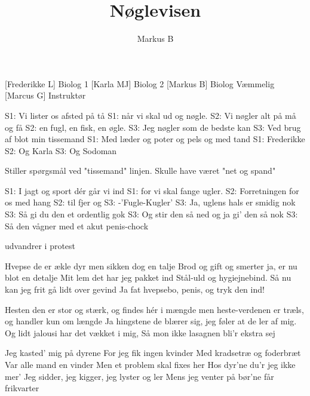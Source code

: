 \documentclass[a4paper,11pt]{article}
\title{Nøglevisen}
\author{Markus B}
\begin{document}
\maketitle

\begin{roles}
[Frederikke L] Biolog 1
[Karla MJ] Biolog 2
[Markus B] Biolog Væmmelig
[Marcus G] Instruktør
\end{roles}

\begin{song}


S1: Vi lister os afsted på tå 
S1: når vi skal ud og nøgle.
S2: Vi nøgler alt på må og få
S2: en fugl, en fisk, en øgle.
S3: Jeg nøgler som de bedste kan
S3: Ved brug af blot min tissemand 
S1: Med læder og poter og pels og med tand
S1: Frederikke S2: Og Karla S3: Og Sodoman 

 Stiller spørgsmål ved "tissemand" linjen. Skulle have været "net og spand" 

S1: I jagt og sport dér går vi ind 
S1: for vi skal fange ugler.
S2: Forretningen for os med hang 
S2: til fjer og 
S3: -'Fugle-Kugler'
S3: Ja, uglens hals er smidig nok
S3: Så gi du den et ordentlig gok
S3: Og stir den så ned og ja gi' den så nok
S3: Så den vågner med et akut penis-chock

 udvandrer i protest

Hvepse de er ækle dyr 
men sikken dog en talje
Brod og gift og smerter ja, 
er nu blot en detalje
Mit lem det har jeg pakket ind
Stål-uld og hygiejnebind.
Så nu kan jeg frit gå lidt over gevind
Ja fat hvepsebo, penis, og tryk den ind!

Hesten den er stor og stærk, 
og findes hér i mængde
men heste-verdenen er træls, 
og handler kun om længde
Ja hingstene de blærer sig, 
jeg føler at de ler af mig.
Og lidt jalousi har det vækket i mig,
Så mon ikke lasagnen bli'r ekstra sej

Jeg kasted' mig på dyrene 
For jeg fik ingen kvinder
Med kradsetræ og foderbræt 
Var alle mand en vinder
Men et problem skal fixes her
Hos dyr'ne du'r jeg ikke mer'
Jeg sidder, jeg kigger, jeg lyster og ler
Mens jeg venter på bør'ne får frikvarter


\end{song}
\end{document}
